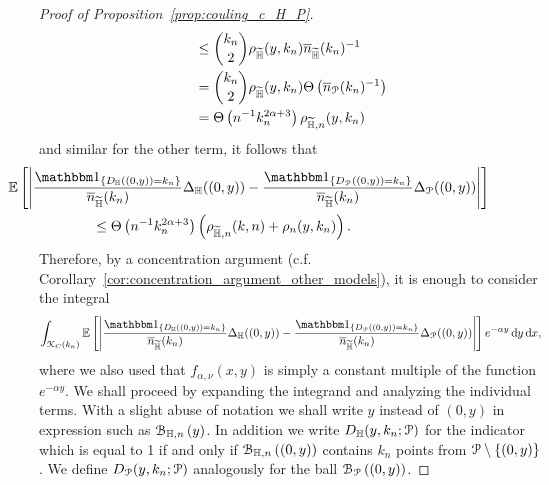 \begin{proof}[Proof of Proposition~\ref{prop:couling_c_H_P}]
\begin{align*}
	&\le \binom{k_n}{2} \rho_{\widetilde{\mathbb{H}}}(y,k_n)\overline{n}_{\widetilde{\mathbb{H}}}(k_n)^{-1} \\
	&= \binom{k_n}{2} \rho_{\widetilde{\mathbb{H}}}(y,k_n)\Theta\left(\overline{n}_{{\mathcal P}}(k_n)^{-1}\right)\\
	&= \Theta\left(n^{-1} k_n^{2\alpha + 3}\right)\rho_{\widetilde{\mathbb{H}},n}(y,k_n)
\end{align*}
and similar for the other term, it follows that
\begin{align*}
	&\hspace{-60pt}\Exp{ \left| \frac{\ind{D_\H((0,y)) = k_n}}{\expH} \Delta_\H ((0,y) )
		- \frac{\ind{D_\Pcal((0,y)) = k_n}}{\expH}  \Delta_\Pcal ((0,y))\right|} \\
	&\le \bigT{n^{-1} k_n^{2\alpha + 3}}\left(\rho_{\HP,n}(k,n) + \rho_n(y,k_n)\right).
\end{align*}
Therefore, by a concentration argument (c.f. Corollary~\ref{cor:concentration_argument_other_models}), it is enough to consider the integral
\begin{equation} \label{eq:expectation_total}
	\int_{\Kcal_{C}(k_n)} \Exp{\left|\frac{\ind{D_\H((0,y)) = k_n}}{\expH} \Delta_\H ((0,y) ) 
		- \frac{\ind{D_\Pcal((0,y)) = k_n}}{\expH} \Delta_\Pcal ((0,y))\right|} e^{-\alpha y} \dd y \dd x,
\end{equation}
where we also used that $f_{\alpha,\nu}(x,y)$ is simply a constant multiple of the function $e^{-\alpha y}$. We shall proceed by expanding the integrand and analyzing the individual terms. With a slight abuse of notation we shall write $y$ instead of $(0,y)$ in expression such as ${\mathcal B}_{\mathbb{H},n}\left(y\right)$. In addition we write $D_{\mathbb{H}}(y,k_n;{\mathcal P})$ for the indicator which is equal to 1 if and only if ${\mathcal B}_{\mathbb{H},n}\left((0,y)\right)$ contains $k_n$ points from ${\mathcal P} \setminus \{(0,y)\}$. We define $D_{{\mathcal P}}(y,k_n;{\mathcal P})$ analogously for the ball ${\mathcal B}_{{\mathcal P}}\left((0,y)\right)$.



\end{proof}

